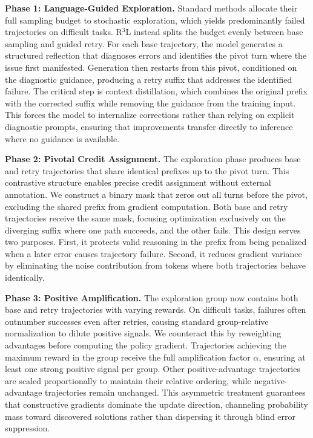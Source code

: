 \documentclass[11pt]{article}
\theoremstyle{definition}
\theoremstyle{remark}
\begin{document}
\textbf{Phase 1: Language-Guided Exploration.} Standard methods allocate their full sampling budget to stochastic exploration, which yields predominantly failed trajectories on difficult tasks. R$^3$L instead splits the budget evenly between base sampling and guided retry. For each base trajectory, the model generates a structured reflection that diagnoses errors and identifies the pivot turn where the issue first manifested. Generation then restarts from this pivot, conditioned on the diagnostic guidance, producing a retry suffix that addresses the identified failure. The critical step is context distillation, which combines the original prefix with the corrected suffix while removing the guidance from the training input. This forces the model to internalize corrections rather than relying on explicit diagnostic prompts, ensuring that improvements transfer directly to inference where no guidance is available.

\textbf{Phase 2: Pivotal Credit Assignment.} The exploration phase produces base and retry trajectories that share identical prefixes up to the pivot turn. This contrastive structure enables precise credit assignment without external annotation. We construct a binary mask that zeros out all turns before the pivot, excluding the shared prefix from gradient computation. Both base and retry trajectories receive the same mask, focusing optimization exclusively on the diverging suffix where one path succeeds, and the other fails. This design serves two purposes. First, it protects valid reasoning in the prefix from being penalized when a later error causes trajectory failure. Second, it reduces gradient variance by eliminating the noise contribution from tokens where both trajectories behave identically.

\textbf{Phase 3: Positive Amplification.} The exploration group now contains both base and retry trajectories with varying rewards. On difficult tasks, failures often outnumber successes even after retries, causing standard group-relative normalization to dilute positive signals. We counteract this by reweighting advantages before computing the policy gradient. Trajectories achieving the maximum reward in the group receive the full amplification factor $\alpha$, ensuring at least one strong positive signal per group. Other positive-advantage trajectories are scaled proportionally to maintain their relative ordering, while negative-advantage trajectories remain unchanged. This asymmetric treatment guarantees that constructive gradients dominate the update direction, channeling probability mass toward discovered solutions rather than dispersing it through blind error suppression.
\end{document}
